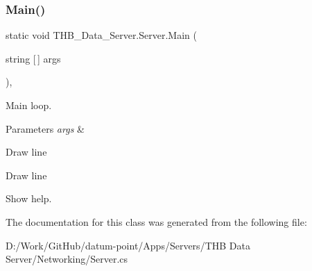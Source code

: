 \subsubsection{\texorpdfstring{Main()}{Main()}}
{\footnotesize\ttfamily static void T\+H\+B\+\_\+\+Data\+\_\+\+Server.\+Server.\+Main (\begin{DoxyParamCaption}\item[{string \mbox{[}$\,$\mbox{]}}]{args }\end{DoxyParamCaption})\hspace{0.3cm}{\ttfamily [static]}, {\ttfamily [private]}}



Main loop. 


\begin{DoxyParams}{Parameters}
{\em args} & \\
\hline
\end{DoxyParams}
Draw line

Draw line

Show help. 

The documentation for this class was generated from the following file\+:\begin{DoxyCompactItemize}
\item 
D\+:/\+Work/\+Git\+Hub/datum-\/point/\+Apps/\+Servers/\+T\+H\+B Data Server/\+Networking/Server.\+cs\end{DoxyCompactItemize}
